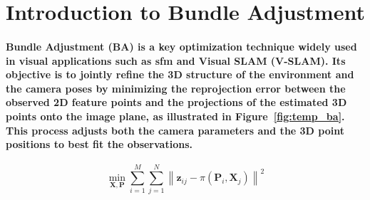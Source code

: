 \section{Introduction to Bundle Adjustment}
%


\paragraph{\textnormal{Bundle Adjustment (BA) is a key optimization technique widely used in visual applications such as \gls{sfm} and Visual SLAM (V-SLAM)\cite{triggs1999bundle}. Its objective is to jointly refine the 3D structure of the environment and the camera poses by minimizing the reprojection error between the observed 2D feature points and the projections of the estimated 3D points onto the image plane, as illustrated in Figure~\ref{fig:temp_ba}. This process adjusts both the camera parameters and the 3D point positions to best fit the observations.}}


\begin{equation}
	\min_{\mathbf{X}, \mathbf{P}} \sum_{i=1}^{M} \sum_{j=1}^{N} \left\| \mathbf{z}_{ij} - \pi(\mathbf{P}_i, \mathbf{X}_j) \right\|^2
	\label{eq:vba}
\end{equation}

